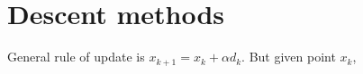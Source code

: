 \section{Descent methods}
\begin{slide}
	General rule of update is $x_{k+1} = x_k +\alpha d_k$. But given  point 
	$x_k$, 
\end{slide}
\begin{slide}
\end{slide}
